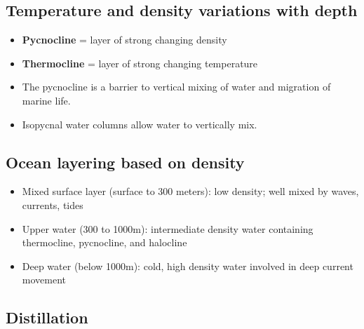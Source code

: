 \subsection{Temperature and density variations with depth}

\begin{itemize}
    \item \textbf{Pycnocline} = layer of strong changing density
    \item \textbf{Thermocline} = layer of strong changing temperature
    \item The pycnocline is a barrier to vertical mixing of water
        and migration of marine life.
    \item Isopycnal water columns allow water to vertically mix.
\end{itemize}

\subsection{Ocean layering based on density}

\begin{itemize}
    \item Mixed surface layer (surface to 300 meters):
        low density; well mixed by waves, currents, tides
    \item Upper water (300 to 1000m): intermediate density
        water containing thermocline, pycnocline, and halocline
    \item Deep water (below 1000m): cold, high density water
        involved in deep current movement
\end{itemize}

\subsection{Distillation}